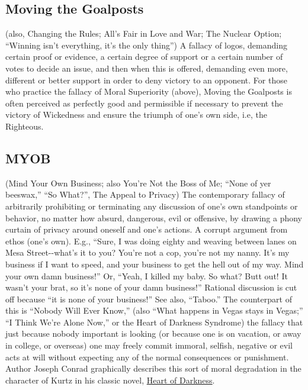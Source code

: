 \documentclass[10pt,a4paper,british]{article}
\begin{document}
\begin{multicols}{2}
    \subsection{Moving the Goalposts} (also, Changing the Rules; All's Fair in Love and War; The Nuclear Option; ``Winning isn't everything, it's the only thing'') A fallacy of logos, demanding certain proof or evidence, a certain degree of support or a certain number of votes to decide an issue, and then when this is offered, demanding even more, different or better support in order to deny victory to an opponent. For those who practice the fallacy of Moral Superiority (above), Moving the Goalposts is often perceived as perfectly good and permissible if necessary to prevent the victory of Wickedness and ensure the triumph of one's own side, i.e, the Righteous.  

    \subsection{MYOB} (Mind Your Own Business;  also You're Not the Boss of Me; ``None of yer beeswax,'' ``So What?'', The Appeal to Privacy) The contemporary fallacy of arbitrarily prohibiting or terminating any discussion of one's own standpoints or behavior, no matter how absurd, dangerous, evil or offensive, by drawing a phony curtain of privacy around oneself and one's actions. A corrupt argument from ethos (one's own). E.g., ``Sure, I was doing eighty and weaving between lanes on Mesa Street{-}{-}what's it to you? You're not a cop, you're not my nanny. It's my business if I want to speed, and your business to get the hell out of my way. Mind your own damn business!'' Or, ``Yeah, I killed my baby. So what?  Butt out! It wasn't your brat, so it's none of your damn business!'' Rational discussion is cut off because ``it is none of your business!'' See also, ``Taboo.'' The counterpart of this is ``Nobody Will Ever Know,'' (also ``What happens in Vegas stays in Vegas;'' ``I Think We're Alone Now,'' or the Heart of Darkness Syndrome) the fallacy that just because nobody important is looking (or because one is on vacation, or away in college, or overseas) one may freely commit immoral, selfish, negative or evil acts at will without expecting any of the normal consequences or punishment. Author Joseph Conrad graphically describes this sort of moral degradation in the character of Kurtz in his classic novel, \href{https://www.amazon.com/Heart-Darkness-Joseph-Conrad/dp/1503275922}{Heart of Darkness}.  


\end{multicols}
\end{document}
